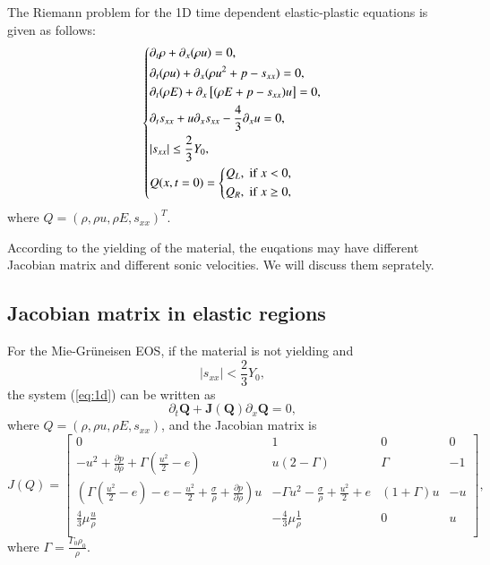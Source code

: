 \documentclass[review]{elsarticle}
\begin{document}
The Riemann problem for the 1D time dependent elastic-plastic equations is given as follows:
 \begin{equation}\label{eq:1d}
   \left\{ \begin{aligned}
       & \partial _t \rho +\partial_x(\rho u)=0,\\
       & \partial _t (\rho u)+\partial_x(\rho u^2 + p -s_{xx})=0,\\
       &\partial _t (\rho E)+\partial_x\left[(\rho E + p -s_{xx})u\right]=0,\\
       &\partial _t s_{xx}+u\partial_xs_{xx}-\frac{4}{3}\partial_x u=0,\\
& |s_{xx}|\leq \frac{2}{3}Y_{0}, \\
       &Q(x,t = 0) = \left\{\begin{aligned}
           Q_L, \hspace{0.1cm} \text{if} \hspace{0.1cm} x<0, \\
           Q_R, \hspace{0.1cm} \text{if} \hspace{0.1cm} x\ge 0, \\
       \end{aligned}\right.
     \end{aligned}
  \right.
\end{equation}
where $Q = (\rho, \rho u, \rho E, s_{xx})^T$.

According to the yielding of the material, the euqations may have different Jacobian matrix and different sonic velocities. We will discuss them seprately.
\subsection{Jacobian matrix in  elastic regions} %
For the Mie-Gr\"uneisen EOS, if the material is not yielding and 
\begin{equation}
  |s_{xx}| < \frac{2}{3}Y_0,
\end{equation}
the system (\ref{eq:1d}) can be written as
\begin{equation}
 \partial_t \mathbf{Q} +\mathbf{J}(\mathbf{{Q}})\partial_x\mathbf{Q} = 0,
\end{equation}
where $Q = (\rho, \rho u, \rho E, s_{xx})$, and the Jacobian matrix is 
\begin{equation}\label{eq:Jcb}
  J(Q) = \left[\begin{array}{llll}
      0 & 1 & 0 & 0 \\
      -u^2 + \frac{\partial p}{\partial \rho} +\Gamma(\frac{u^2}{2}-e)& u(2-\Gamma)& \Gamma & -1 \\
	  (\Gamma(\frac{u^2}{2}-e)-e-\frac{u^2}{2}+\frac{\sigma}{\rho}+\frac{\partial p}{\partial \rho})u & -\Gamma u^2 -\frac{\sigma}{\rho}+\frac{u^2}{2} +e & (1+\Gamma)u& -u\\
    \frac{4}{3}\mu\frac{u}{\rho} & -\frac{4}{3}\mu\frac{1}{\rho}& 0 & u \\
\end{array}
\right],
\end{equation}
where $\Gamma = \frac{\Gamma_0\rho_0}{\rho} $.
\end{document}

